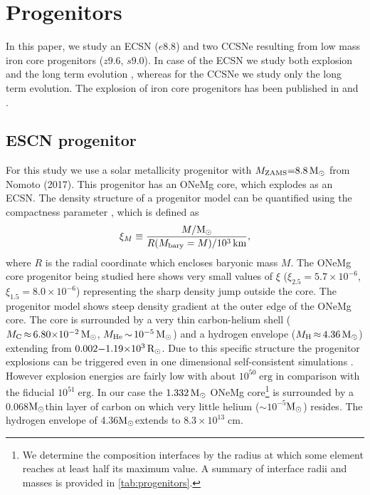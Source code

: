 \documentclass[fleqn,usenatbib]{mnras}
\newcommand{\solr}{\xspace\ensuremath{\rm{R_{\odot}}}}
\newcommand{\solm}{\xspace\ensuremath{\rm{M_{\odot}}}}
\begin{document}
\section{Progenitors}
In this paper, we study an ECSN ($e8.8$) and two  CCSNe resulting from low mass iron core  progenitors ($z9.6$, $s9.0$). In case of the ECSN we study both explosion and the long term evolution , whereas for the CCSNe we study only the long term evolution. The explosion of iron core progenitors has been published in \cite{Melson2015} and \cite{Melson2019}. 

\subsection{ESCN progenitor}
For this study we use a solar metallicity progenitor with $M_{\rm ZAMS}\mathord{=}8.8\,\solm$ from Nomoto (2017). This progenitor has an ONeMg core, which explodes as an ECSN. The density structure of a progenitor model can be quantified using the compactness parameter \citep{Oconnor2011}, which is defined as
\begin{equation}
\label{equ:compactness}
  \xi_{M} \equiv \frac{M/\solm}{R(M_{\rm bary}=M)/10^{3}\, \rm km},
\end{equation}
where $R$ is the radial coordinate which encloses baryonic mass $M$. The ONeMg core progenitor being studied here shows very small values of $\xi$ ($\xi_{2.5}=5.7\times10^{-6}$, $\xi_{1.5}=8.0\times10^{-6}$)  representing the sharp density jump outside the core. The progenitor model shows steep density gradient at the outer edge of the ONeMg core. The core is surrounded by a very thin carbon-helium shell ($M_{\rm C}\,\mathord{\approx}\, 6.80\mathord{\times}10^{-2}\, \solm$, $M_{\rm He}\,\mathord{\sim}\,10^{-5}\, \solm$) and a hydrogen envelope ($M_{\rm H}\,\mathord{\approx}\, 4.36\, \solm$) extending from $0.002\mathord{-} \mathord{1.19}\mathord{\times}10^{3}\, \solr$.
Due to this specific structure the progenitor explosions can be triggered even in one dimensional self-consistent simulations \citet{Groote2014,Kitaura2006}. However explosion energies are fairly low with about $10^{50}\;\mathrm{erg}$ in comparison with the fiducial $10^{51}\;\mathrm{erg}$. In our case the $1.332\, \solm$ ONeMg core\footnote{We determine the composition interfaces by the radius at which some element reaches at least half its maximum value. A summary of interface radii and masses is provided in \autoref{tab:progenitors}.} is surrounded by a 0.068\solm thin layer of carbon on which very little helium ($\sim 10^{-5}$\solm) resides. The hydrogen envelope of 4.36\solm extends to $8.3\times10^{13}\;\mathrm{cm}$. 
\end{document}
